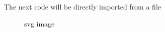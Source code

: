 \documentclass{article}
\begin{document}
    The next code will be directly imported from a file


\begin{figure}[htbp]
    \centering
    
    \caption{svg image}
    \label{fig:figure}
\end{figure}
\end{document}
